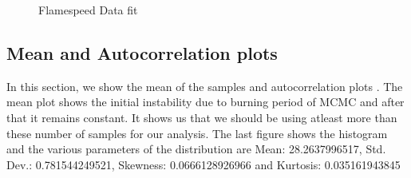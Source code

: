  \begin{figure}[H]
  \ContinuedFloat
  \centering
  \caption{Flamespeed Data fit}
\end{figure}



\subsection{Mean and Autocorrelation plots}

\noindent In this section, we show the mean of the samples and autocorrelation plots . The mean plot shows the initial instability due to burning period of MCMC and after that it remains constant. It shows us that we should be using atleast more than these number of samples for our analysis. The last figure shows the histogram and the various parameters of the distribution are Mean:  28.2637996517, Std. Dev.:  0.781544249521, Skewness:  0.0666128926966 and Kurtosis:  0.035161943845


